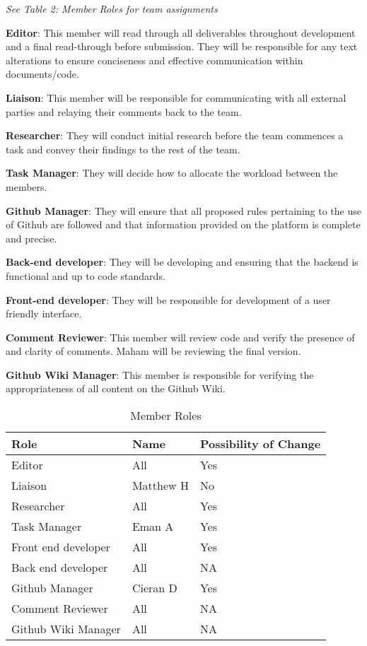 \documentclass{article}
\begin{document}
\textit{See Table 2: Member Roles for team assignments} \\
\begin{flushleft}
  \textbf{Editor}: This member will read through all deliverables throughout development and a final read-through before submission. They will be responsible for any
  text alterations to ensure conciseness and effective communication within documents/code.
 
  \textbf{Liaison}: This member will be responsible for communicating with all external parties and relaying their comments back to the team.

  \textbf{Researcher}: They will conduct initial research before the team commences a task and convey their findings to the rest of the team.

  \textbf{Task Manager}: They will decide how to allocate the workload between the members.

  \textbf{Github Manager}: They will ensure that all proposed rules pertaining to the use of Github are followed and that information provided on the platform is complete and precise.

  \textbf{Back-end developer}: They will be developing and ensuring that the backend is functional and up to code standards.

  \textbf{Front-end developer}: They will be responsible for development of a user friendly interface.

  \textbf{Comment Reviewer}: This member will review code and verify the presence of and clarity of comments. Maham will be reviewing the final version.

  \textbf{Github Wiki Manager}: This member is responsible for verifying the appropriateness of all content on the Github Wiki.
\end{flushleft}

\begin{table}[H]
\caption{Member Roles} \label{Proposed Assignments}
\begin{tabularx}{\textwidth}{llX}
\toprule
\textbf{Role} & \textbf{Name} & \textbf{Possibility of Change}\\
\midrule
Editor & All & Yes\\
Liaison & Matthew H  & No\\
Researcher & All & Yes \\
Task Manager & Eman A & Yes \\
Front end developer & All & Yes \\
Back end developer & All & NA \\
Github Manager & Cieran D & Yes \\
Comment Reviewer & All & NA \\
Github Wiki Manager & All & NA \\
\bottomrule
\end{tabularx}
\end{table}
\end{document}
